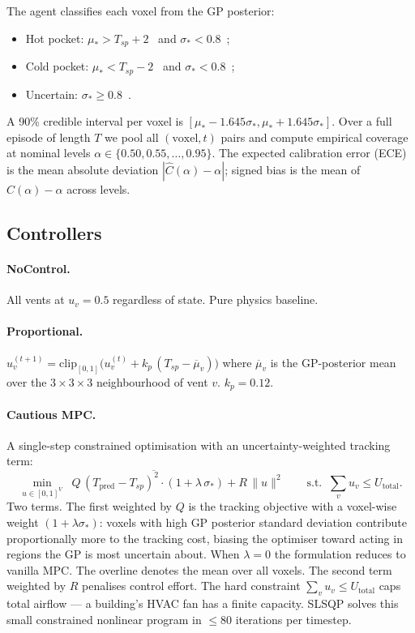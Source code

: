 \documentclass[11pt,letterpaper]{article}
\begin{document}
The agent classifies each voxel from the GP posterior:
\begin{itemize}
\itemsep0pt
\item Hot pocket: $\mu_* > T_{sp} + 2$~\textcelsius{} and $\sigma_* < 0.8$~\textcelsius;
\item Cold pocket: $\mu_* < T_{sp} - 2$~\textcelsius{} and $\sigma_* < 0.8$~\textcelsius;
\item Uncertain: $\sigma_* \ge 0.8$~\textcelsius.
\end{itemize}
A 90\% credible interval per voxel is $[\mu_* - 1.645\sigma_*, \mu_* + 1.645\sigma_*]$.
Over a full episode of length $T$ we pool all $(\text{voxel}, t)$ pairs and
compute empirical coverage at nominal levels
$\alpha \in \{0.50, 0.55, \dots, 0.95\}$. The expected calibration error
(ECE) is the mean absolute deviation $|\widehat{C}(\alpha) - \alpha|$;
signed bias is the mean of $\widehat{C}(\alpha) - \alpha$ across levels.

\subsection{Controllers}

\paragraph{NoControl.} All vents at $u_v = 0.5$ regardless of state. Pure
physics baseline.

\paragraph{Proportional.}
$u_v^{(t+1)} = \mathrm{clip}_{[0,1]}\!\big(u_v^{(t)} + k_p \,(T_{sp} -
\overline{\mu}_v)\big)$ where $\overline{\mu}_v$ is the GP-posterior mean
over the $3{\times}3{\times}3$ neighbourhood of vent $v$. $k_p = 0.12$.

\paragraph{Cautious MPC.} A single-step constrained optimisation with an
uncertainty-weighted tracking term:
\begin{equation}
\min_{u \in [0, 1]^V} \;\;
   Q \, \overline{(T_{\mathrm{pred}} - T_{sp})^2 \cdot (1 + \lambda \, \sigma_*)}
 + R \, \|u\|^2
\qquad \text{s.t.} \;\; \sum_v u_v \le U_{\mathrm{total}}.
\label{eq:mpc}
\end{equation}
Two terms. The first weighted by $Q$ is the tracking objective with a
voxel-wise weight $(1 + \lambda \sigma_*)$: voxels with high GP posterior
standard deviation contribute proportionally more to the tracking cost,
biasing the optimiser toward acting in regions the GP is most uncertain
about. When $\lambda = 0$ the formulation reduces to vanilla MPC. The
overline denotes the mean over all voxels. The second term weighted by
$R$ penalises control effort. The hard constraint
$\sum_v u_v \le U_\mathrm{total}$ caps total airflow --- a building's
HVAC fan has a finite capacity. SLSQP solves this small constrained
nonlinear program in $\le 80$ iterations per timestep.
\end{document}
